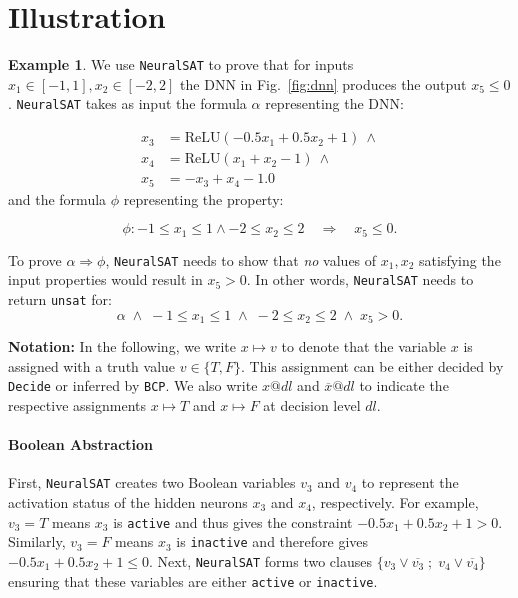 \documentclass[oneside,11pt,dvipsnames]{book}
\numberwithin{equation}{section}
\theoremstyle{definition}
\newtheorem{example}{Example}[section]
\theoremstyle{remark}
\newcommand{\neuralsat}{\texttt{NeuralSAT}}
\newcommand{\relu}[1]{\mathrm{ReLU}\left(#1\right)}
\begin{document}
\section{Illustration}
\begin{example}\label{ex:neuralsat}
We use \neuralsat{} to prove that for inputs $x_1 \in [-1, 1], x_2 \in [-2,2]$ the DNN in Fig.~\ref{fig:dnn} produces the output $x_5 \le 0$.
\neuralsat{} takes as input the formula $\alpha$ representing the DNN:

\begin{equation*}%
\begin{aligned}
  x_3 &=  \relu{-0.5x_1 + 0.5x_2 + 1} ~\land\\
  x_4 &= \relu{x_1 + x_2 - 1} ~\land\\
  x_5 &= -x_3 + x_4 - 1.0
\end{aligned}
\end{equation*}
and the formula $\phi$ representing the property:

\begin{equation*}\label{eq:valid_prop}
    \phi : -1\le x_1 \le 1 \land -2 \le x_2 \le 2 \quad\Rightarrow\quad x_5 \le 0.
\end{equation*}

To prove $\alpha \Rightarrow \phi$, \neuralsat{} needs to show  that \emph{no} values of $x_1,x_2$ satisfying the input properties would result in $x_5 > 0$. In other words, \neuralsat{} needs to return \texttt{unsat} for: 
\begin{equation}\label{eq:negprop}
  \alpha\; \land\; -1 \le x_1 \le 1     \;\land\; -2 \le x_2 \le 2   \;\land\; x_5 > 0.
\end{equation} 

\textbf{Notation:} In the following, we write $x \mapsto v$ to denote that the variable $x$ is assigned with a truth value $v \in \{T,F\}$. This assignment can be either decided by \texttt{Decide} or inferred by \texttt{BCP}. We also write $x@dl$ and  $\overline{x}@dl$ to indicate the respective assignments $x \mapsto T$ and $x \mapsto F$  at decision level $dl$.

\paragraph{Boolean Abstraction} First, \neuralsat{} creates two Boolean variables $v_3$ and $v_4$ to represent the
activation status of the hidden neurons $x_3$ and $x_4$, respectively. For example, $v_3=T$ means $x_3$ is \texttt{active} and thus gives the constraint $-0.5x_1 + 0.5x_2 + 1 > 0$. Similarly, $v_3=F$ means $x_3$ is \texttt{inactive} and therefore gives $-0.5x_1 + 0.5x_2 + 1\le 0$. Next, \neuralsat{} forms two clauses  $\{v_3 \lor \overline{v_3} \;;\; v_4 \lor \overline{v_4}\}$ ensuring that these variables are either \texttt{active} or \texttt{inactive}.



\end{example}
\end{document}
